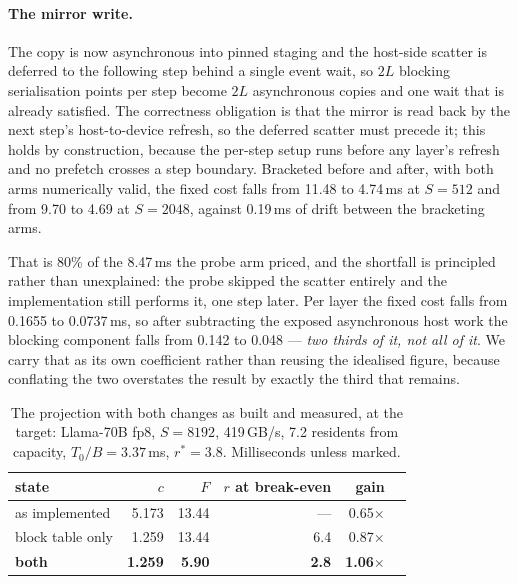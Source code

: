 \paragraph{The mirror write.} The copy is now asynchronous into pinned staging
and the host-side scatter is deferred to the following step behind a single
event wait, so $2L$ blocking serialisation points per step become $2L$
asynchronous copies and one wait that is already satisfied. The correctness
obligation is that the mirror is read back by the next step's host-to-device
refresh, so the deferred scatter must precede it; this holds by construction,
because the per-step setup runs before any layer's refresh and no prefetch
crosses a step boundary. Bracketed before and after, with both arms numerically
valid, the fixed cost falls from 11.48 to 4.74\,ms at $S{=}512$ and from 9.70 to
4.69 at $S{=}2048$, against 0.19\,ms of drift between the bracketing arms.

That is 80\% of the 8.47\,ms the probe arm priced, and the shortfall is
principled rather than unexplained: the probe skipped the scatter entirely and
the implementation still performs it, one step later. Per layer the fixed cost
falls from 0.1655 to 0.0737\,ms, so after subtracting the exposed asynchronous
host work the blocking component falls from 0.142 to 0.048 --- \emph{two thirds
of it, not all of it}. We carry that as its own coefficient rather than reusing
the idealised figure, because conflating the two overstates the result by
exactly the third that remains.

\begin{table}[t]
\centering
\small
\begin{tabular}{@{}lrrrrl@{}}
\toprule
state & $c$ & $F$ & $r$ at break-even & gain \\
\midrule
as implemented   & 5.173 & 13.44 & --- & 0.65$\times$ \\
block table only & 1.259 & 13.44 & 6.4 & 0.87$\times$ \\
\textbf{both}    & \textbf{1.259} & \textbf{5.90} & \textbf{2.8} & \textbf{1.06}$\mathbf{\times}$ \\
\bottomrule
\end{tabular}
\caption{The projection with both changes as built and measured, at the target:
Llama-70B fp8, $S{=}8192$, 419\,GB/s, 7.2 residents from capacity,
$T_0/B = 3.37$\,ms, $r^{*} = 3.8$. Milliseconds unless marked.}
\label{tab:overhead:delivered}
\end{table}

